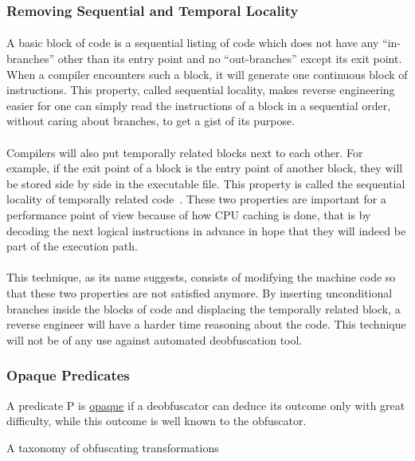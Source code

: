 \subsubsection{Removing Sequential and Temporal Locality}
\paragraph{}
A basic block of code is a sequential listing of code which does not have any “in-branches” other than its entry point and no “out-branches” except its exit point. When a compiler encounters such a block, it will generate one continuous block of instructions. This property, called sequential locality, makes reverse engineering easier for one can simply read the instructions of a block in a sequential order, without caring about branches, to get a gist of its purpose.

\paragraph{}
Compilers will also put temporally related blocks next to each other. For example, if the exit point of a block is the entry point of another block, they will be stored side by side in the executable file. This property is called the sequential locality of temporally related code~\cite{Dang:2014:PRE:2636663}. These two properties are important for a performance point of view because of how CPU caching is done, that is by decoding the next logical instructions in advance in hope that they will indeed be part of the execution path. 

\paragraph{}
This technique, as its name suggests, consists of modifying the machine code so that these two properties are not satisfied anymore. By inserting unconditional branches inside the blocks of code and displacing the temporally related block, a reverse engineer will have a harder time reasoning about the code. This technique will not be of any use against automated deobfuscation tool.

\pagebreak

\subsubsection{Opaque Predicates} \label{sec:opaque_predicates}
\begin{framed}
	\begin{definition}
		A predicate P is \underline{opaque} if a deobfuscator can deduce its outcome only with great difficulty, while this outcome is well known to the obfuscator.
		\begin{flushright}
			\hfill{}{A taxonomy of obfuscating transformations~\cite{collberg1997taxonomy}}
		\end{flushright}
	\end{definition}
\end{framed}

